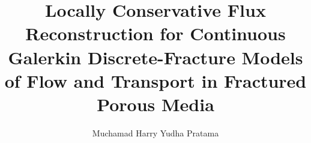 \documentclass[a4paper,fleqn]{cas-sc}
\begin{document}
\let\WriteBookmarks\relax
\def\floatpagepagefraction{1}
\def\textpagefraction{.001}


\title[mode=title]{Locally Conservative Flux Reconstruction for Continuous Galerkin Discrete-Fracture Models of Flow and Transport in Fractured Porous Media}

\author[1]{Muchamad Harry Yudha Pratama}
\cormark[1]
\ead{}
\credit{}



\begin{abstract}

\end{abstract}
\end{document}
